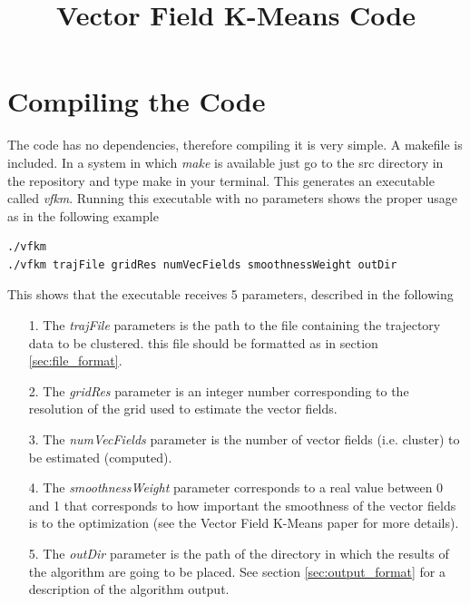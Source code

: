 \documentclass[10pt]{article}
\title{Vector Field K-Means Code}
\begin{document}
\maketitle

\section{Compiling the Code}
\vspace{0.2cm}
The code has no dependencies, therefore compiling it is very simple. A makefile is
included. In a system in which \emph{make} is available just go to the src directory
in the repository and type make in your terminal. This generates an executable called
\emph{vfkm}. Running this executable with no parameters shows the proper usage as in the
following example

\begin{lstlisting}
./vfkm 
./vfkm trajFile gridRes numVecFields smoothnessWeight outDir
\end{lstlisting}

This shows that the executable receives 5 parameters, described in the following

\begin{itemize}
\item[1.] The \emph{trajFile} parameters is the path to the file containing the trajectory data to be clustered.
this file should be formatted as in section \ref{sec:file_format}.
\item[2.] The \emph{gridRes} parameter is an integer number corresponding to the resolution of the grid used to 
estimate the vector fields.
\item[3.] The \emph{numVecFields} parameter is the number of vector fields (i.e. cluster) to be estimated (computed).
\item[4.] The \emph{smoothnessWeight} parameter corresponds to a real value between 0 and 1 that corresponds to how
important the smoothness of the vector fields is to the optimization (see the Vector Field K-Means paper for more details).
\item[5.] The \emph{outDir} parameter is the path of the directory in which the results of the algorithm are going to be placed.
See section \ref{sec:output_format} for a description of the algorithm output.
\end{itemize}
\end{document}
